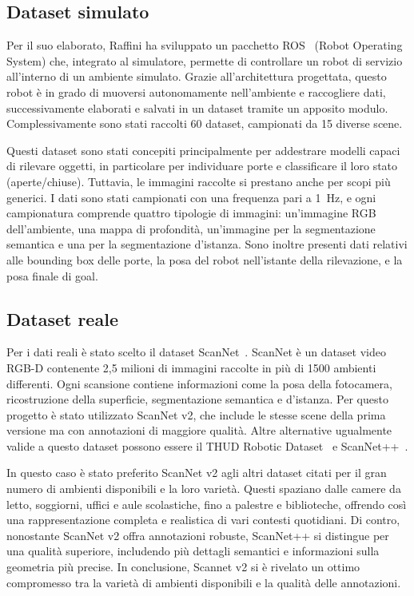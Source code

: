 \documentclass[12pt]{report}
\begin{document}
\subsection{Dataset simulato}
\label{sec:dataset_simulato}

Per il suo elaborato, Raffini ha sviluppato un pacchetto ROS~\cite{quigley2009ros} (Robot Operating System) che, integrato al simulatore, permette di controllare un robot di servizio all'interno di un ambiente simulato. Grazie all'architettura progettata, questo robot è in grado di muoversi autonomamente nell'ambiente e raccogliere dati, successivamente elaborati e salvati in un dataset tramite un apposito modulo. Complessivamente sono stati raccolti 60 dataset, campionati da 15 diverse scene.

Questi dataset sono stati concepiti principalmente per addestrare modelli capaci di rilevare oggetti, in particolare per individuare porte e classificare il loro stato (aperte/chiuse). Tuttavia, le immagini raccolte si prestano anche per scopi più generici. I dati sono stati campionati con una frequenza pari a \SI{1}{\hertz}, e ogni campionatura comprende quattro tipologie di immagini: un'immagine RGB dell'ambiente, una mappa di profondità, un'immagine per la segmentazione semantica e una per la segmentazione d'istanza. Sono inoltre presenti dati relativi alle bounding box delle porte, la posa del robot nell'istante della rilevazione, e la posa finale di goal.

\subsection{Dataset reale}
\label{sec:dataset_reale}

Per i dati reali è stato scelto il dataset ScanNet~\cite{dai2017scannet}. ScanNet è un dataset video RGB-D contenente 2,5 milioni di immagini raccolte in più di 1500 ambienti differenti. Ogni scansione contiene informazioni come la posa della fotocamera, ricostruzione della superficie, segmentazione semantica e d'istanza. Per questo progetto è stato utilizzato ScanNet v2, che include le stesse scene della prima versione ma con annotazioni di maggiore qualità. Altre alternative ugualmente valide a questo dataset possono essere il THUD Robotic Dataset~\cite{10611489} e ScanNet++~\cite{yeshwanth2023scannethighfidelitydataset3d}.

In questo caso è stato preferito ScanNet v2 agli altri dataset citati per il gran numero di ambienti disponibili e la loro varietà. Questi spaziano dalle camere da letto, soggiorni, uffici e aule scolastiche, fino a palestre e biblioteche, offrendo così una rappresentazione completa e realistica di vari contesti quotidiani. Di contro, nonostante ScanNet v2 offra annotazioni robuste, ScanNet++ si distingue per una qualità superiore, includendo più dettagli semantici e informazioni sulla geometria più precise. In conclusione, Scannet v2 si è rivelato un ottimo compromesso tra la varietà di ambienti disponibili e la qualità delle annotazioni.
\end{document}
